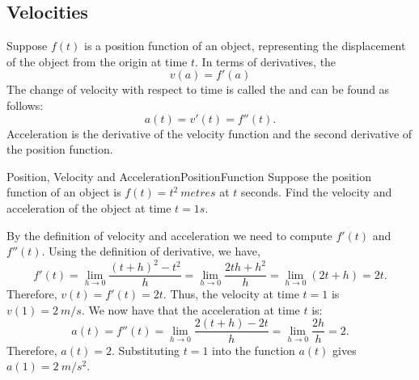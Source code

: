 \subsection{Velocities}
Suppose $f(t)$ is a position function of an object, representing the displacement of the object from the origin at time $t$.
In terms of derivatives, the 
$$v(a)=f'(a)$$
The change of velocity with respect to time is called the  and can be found as follows:
$$a(t)=v'(t)=f''(t).$$
Acceleration is the derivative of the velocity function and the second derivative of the position function.

\begin{example}{Position, Velocity and Acceleration}{PositionFunction}
Suppose the position function of an object is $f(t)=t^2~metres$ at $t$ seconds.
Find the velocity and acceleration of the object at time $t=1s$.
\end{example}

\begin{solution} 
By the definition of velocity and acceleration we need to compute $f'(t)$ and $f''(t)$.
Using the definition of derivative, we have,
$$f'(t)=\lim_{h\to 0}\frac{(t+h)^2-t^2}{h}=\lim_{h\to 0}\frac{2th+h^2}{h}=\lim_{h\to 0}(2t+h)=2t.$$
Therefore, $v(t)=f'(t)=2t$.
Thus, the velocity at time $t=1$ is $v(1)=2~m/s$.
We now have that the acceleration at time $t$ is:
$$a(t)=f''(t)=\lim_{h\to 0}\frac{2(t+h)-2t}{h}=\lim_{h\to 0}\frac{2h}{h}=2.$$
Therefore, $a(t)=2$.
Substituting $t=1$ into the function $a(t)$ gives $a(1)=2~m/s^2$.
\end{solution}
